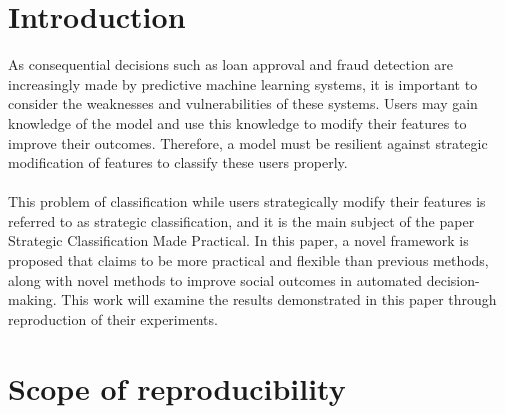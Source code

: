 \section{Introduction}
As consequential decisions such as loan approval and fraud detection are increasingly made by predictive machine learning systems, it is important to consider the weaknesses and vulnerabilities of these systems. Users may gain knowledge of the model and use this knowledge to modify their features to improve their outcomes. Therefore, a model must be resilient against strategic modification of features to classify these users properly.\\\\
This problem of classification while users strategically modify their features is referred to as strategic classification, and it is the main subject of the paper Strategic Classification  Made Practical\cite{levanon2021strategic}. In this paper, a novel framework is proposed that claims to be more practical and flexible than previous methods, along with novel methods to improve social outcomes in automated decision-making. This work will examine the results demonstrated in this paper through reproduction of their experiments.

\section{Scope of reproducibility} \label{sec:scope}
\label{sec:claims}



